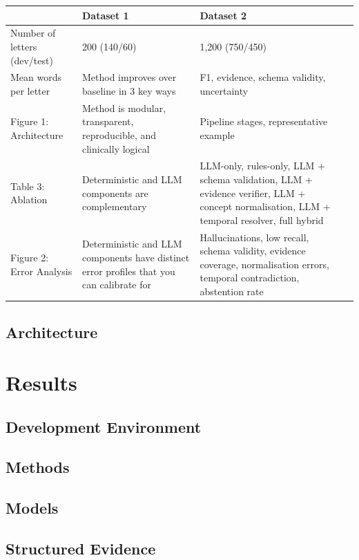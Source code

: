 \documentclass[conference]{IEEEtran}
\begin{document}
\begin{tabularx}{\linewidth}{|Y|Y|Y|Y|}
\hline
\textbf{} &
\textbf{Dataset 1} &
\textbf{Dataset 2} \\
\hline

Number of letters (dev/test) &
200 (140/60) &
1,200 (750/450) \\
\hline

Mean words per letter  &
Method improves over baseline in 3 key ways &
F1, evidence, schema validity, uncertainty \\
\hline

Figure 1: Architecture &
Method is modular, transparent, reproducible, and clinically logical &
Pipeline stages, representative example \\
\hline

Table 3: Ablation &
Deterministic and LLM components are complementary &
LLM-only, rules-only, LLM + schema validation, LLM + evidence verifier,
LLM + concept normalisation, LLM + temporal resolver, full hybrid \\
\hline

Figure 2: Error Analysis &
Deterministic and LLM components have distinct error profiles that you can calibrate for &
Hallucinations, low recall, schema validity, evidence coverage,
normalisation errors, temporal contradiction, abstention rate  \\
\hline
\end{tabularx}


\subsection{Architecture}

\section{Results}
\subsection{Development Environment}
\subsection{Methods}
\subsection{Models}
\subsection{Structured Evidence}
\end{document}
